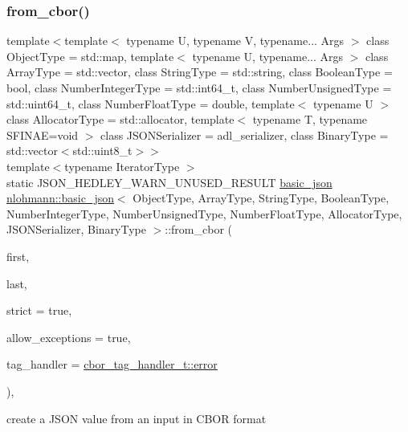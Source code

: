\subsubsection{\texorpdfstring{from\+\_\+cbor()}{from\_cbor()}\hspace{0.1cm}{\footnotesize\ttfamily [2/2]}}
{\footnotesize\ttfamily template$<$template$<$ typename U, typename V, typename... Args $>$ class Object\+Type = std\+::map, template$<$ typename U, typename... Args $>$ class Array\+Type = std\+::vector, class String\+Type  = std\+::string, class Boolean\+Type  = bool, class Number\+Integer\+Type  = std\+::int64\+\_\+t, class Number\+Unsigned\+Type  = std\+::uint64\+\_\+t, class Number\+Float\+Type  = double, template$<$ typename U $>$ class Allocator\+Type = std\+::allocator, template$<$ typename T, typename S\+F\+I\+N\+A\+E=void $>$ class J\+S\+O\+N\+Serializer = adl\+\_\+serializer, class Binary\+Type  = std\+::vector$<$std\+::uint8\+\_\+t$>$$>$ \\
template$<$typename Iterator\+Type $>$ \\
static J\+S\+O\+N\+\_\+\+H\+E\+D\+L\+E\+Y\+\_\+\+W\+A\+R\+N\+\_\+\+U\+N\+U\+S\+E\+D\+\_\+\+R\+E\+S\+U\+LT \hyperlink{classnlohmann_1_1basic__json}{basic\+\_\+json} \hyperlink{classnlohmann_1_1basic__json}{nlohmann\+::basic\+\_\+json}$<$ Object\+Type, Array\+Type, String\+Type, Boolean\+Type, Number\+Integer\+Type, Number\+Unsigned\+Type, Number\+Float\+Type, Allocator\+Type, J\+S\+O\+N\+Serializer, Binary\+Type $>$\+::from\+\_\+cbor (\begin{DoxyParamCaption}\item[{Iterator\+Type}]{first,  }\item[{Iterator\+Type}]{last,  }\item[{const bool}]{strict = {\ttfamily true},  }\item[{const bool}]{allow\+\_\+exceptions = {\ttfamily true},  }\item[{const \hyperlink{namespacenlohmann_1_1detail_a58bb1ef1a9ad287a9cfaf1855784d9ac}{cbor\+\_\+tag\+\_\+handler\+\_\+t}}]{tag\+\_\+handler = {\ttfamily \hyperlink{namespacenlohmann_1_1detail_a58bb1ef1a9ad287a9cfaf1855784d9acacb5e100e5a9a3e7f6d1fd97512215282}{cbor\+\_\+tag\+\_\+handler\+\_\+t\+::error}} }\end{DoxyParamCaption})\hspace{0.3cm}{\ttfamily [inline]}, {\ttfamily [static]}}



create a J\+S\+ON value from an input in C\+B\+OR format 

